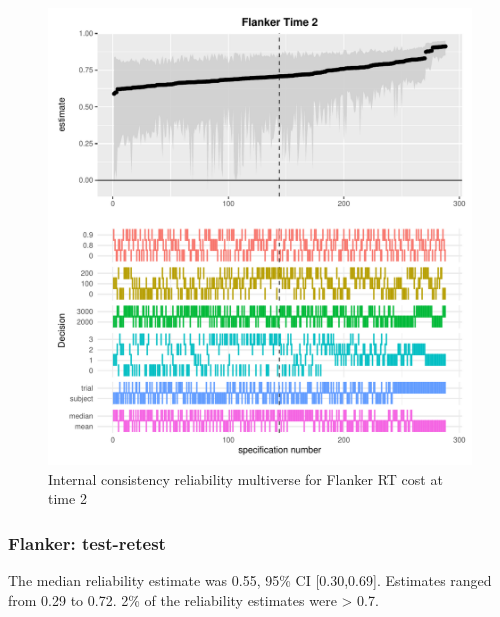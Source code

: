 \documentclass[
  man,floatsintext]{apa6}
\begin{document}
\begin{figure}
\centering
\includegraphics{Reliability_Multiverse_files/figure-latex/unnamed-chunk-9-1.pdf}
\caption{\label{fig:unnamed-chunk-9}Internal consistency reliability multiverse for Flanker RT cost at time 2}
\end{figure}

\newpage

\hypertarget{flanker-test-retest}{%
\subsubsection{Flanker: test-retest}\label{flanker-test-retest}}

The median reliability estimate was 0.55, 95\% CI {[}0.30,0.69{]}. Estimates ranged from 0.29 to 0.72. 2\% of the reliability estimates were \textgreater{} 0.7.
\end{document}
